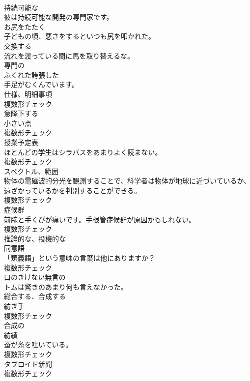\documentclass[8pt]{extreport}
\begin{document}
\begin{CJK}{UTF8}{min}
\\	[形容詞]	持続可能な	
\\	彼は持続可能な開発の専門家です。	
\\	[動詞]	お尻をたたく	
\\	子どもの頃、悪さをするといつも尻を叩かれた。	
\\	[動詞]	交換する	
\\	流れを渡っている間に馬を取り替えるな。	
\\	[副詞]	専門の	
\\	[形容詞]	ふくれた誇張した	
\\	手足がむくんでいます。	
\\	[名詞]	仕様、明細事項	
\\	複数形チェック
\\	[動詞]	急降下する	
\\	[名詞]	小さい点	
\\	複数形チェック
\\	[名詞]	授業予定表	
\\	ほとんどの学生はシラバスをあまりよく読まない。	
\\	複数形チェック
\\	[名詞]	スペクトル、範囲	
\\	物体の電磁波的分光を観測することで、科学者は物体が地球に近づいているか、遠ざかっているかを判別することができる。	
\\	複数形チェック
\\	[名詞]	症候群	
\\	前腕と手くびが痛いです。手根管症候群が原因かもしれない。	
\\	複数形チェック
\\	[形容詞]	推論的な、投機的な	
\\	[名詞]	同意語	
\\	「類義語」という意味の言葉は他にありますか？	
\\	複数形チェック
\\	[形容詞]	口のきけない無言の	
\\	トムは驚きのあまり何も言えなかった。	
\\	[動詞]	総合する、合成する	
\\	[名詞]	紡ぎ手	
\\	複数形チェック
\\	[形容詞]	合成の	
\\	[名詞]	紡績	
\\	蚕が糸を吐いている。	
\\	複数形チェック
\\	[名詞]	タブロイド新聞	
\\	複数形チェック

\end{CJK}
\end{document}
